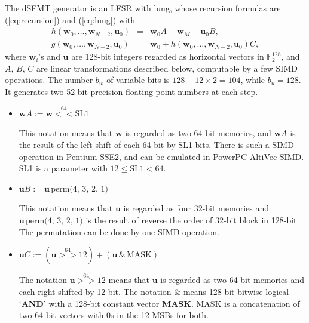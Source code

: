 \documentclass{svmult}
\begin{document}
The dSFMT generator is an LFSR with lung, whose recursion formulas are
(\ref{eq:recursion}) and (\ref{eq:lung}) with
\begin{eqnarray}
  h(\mathbf{w}_0, \ldots , \mathbf{w}_{N-2}, \mathbf{u}_0)
  &=& \mathbf{w}_{0}A + \mathbf{w}_{M} + \mathbf{u}_{0}B, \label{eq:dsfmt}
  \\
  g(\mathbf{w}_0, \ldots , \mathbf{w}_{N-2}, \mathbf{u}_0)
  &=& \mathbf{w}_{0} 
  + h(\mathbf{w}_0, \ldots , \mathbf{w}_{N-2}, \mathbf{u}_0)C, \label{eq:dsfmt-lung}
\end{eqnarray}
where $\mathbf{w}_i$'s and $\mathbf{u}$ are
128-bit integers regarded as horizontal vectors
in ${\mathbb F}_2^{128}$, and $A$, $B$, $C$ are linear transformations
described below, 
computable by a few SIMD operations. The number $b_w$ of variable bits
is $128-12\times 2=104$, while $b_u=128$. It generates two 52-bit
precision floating point numbers at each step.
\begin{itemize}
\item 
  $\mathbf{w} A := \mathbf{w} \stackrel{64}{<<} \textrm{SL1}$

  This notation means that $\mathbf{w}$ is regarded as two 
  64-bit memories, and $\mathbf{w} A$ is the result of the left-shift
  of each 64-bit by SL1 bits. There is such a SIMD operation in 
  Pentium SSE2, and can be emulated in PowerPC AltiVec SIMD.
  SL1 is a parameter with $12 \le \textrm{SL1} < 64$.

\item
  $\mathbf{u} B := \mathbf{u}\,\textrm{perm(4, 3, 2, 1)}$

  This notation means that $\mathbf{u}$ is regarded as four
  32-bit memories and $\mathbf{u}\,\textrm{perm(4, 3, 2, 1)}$ is
  the result of reverse the order of 32-bit block in 128-bit.
  The permutation can be done by one SIMD operation.

\item 
  $\mathbf{u} C := (\mathbf{u} \stackrel{64}{>>} 12) 
  + (\mathbf{u}\, \& \,\textrm{MASK})$

  The notation $\mathbf{u} \stackrel{64}{>>} 12$ means that
  $\mathbf{u}$ is regarded as two 64-bit memories and each
  right-shifted by 12 bit.  The notation $\&$ means 128-bit
  bitwise logical `\textbf{AND}' with a 128-bit constant vector \textbf{MASK}.
  MASK is a concatenation of two 64-bit vectors with 0s in the 12 MSBs 
  for both.

\end{itemize}
\end{document}
